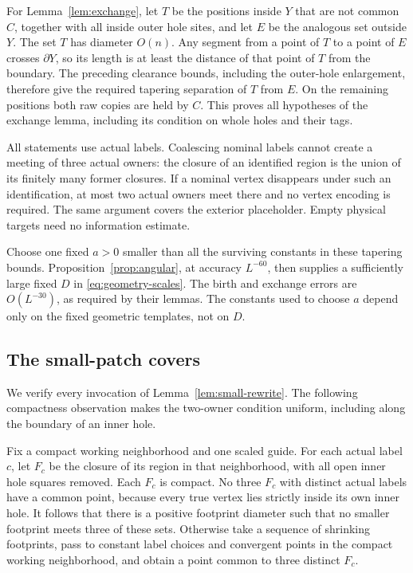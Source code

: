For Lemma~\ref{lem:exchange}, let $T$ be the positions inside $Y$
that are not common $C$, together with all inside outer hole sites,
and let $E$ be the analogous set outside $Y$.  The set $T$ has
diameter $O(n)$.  Any segment from a point of $T$ to a point of $E$
crosses $\partial Y$, so its length is at least the distance of that
point of $T$ from the boundary.  The preceding clearance bounds,
including the outer-hole enlargement, therefore give the required
tapering separation of $T$ from $E$.  On the remaining positions both
raw copies are held by $C$.  This proves all hypotheses of the exchange
lemma, including its condition on whole holes and their tags.

All statements use actual labels.  Coalescing nominal labels cannot
create a meeting of three actual owners: the closure of an identified
region is the union of its finitely many former closures.  If a nominal
vertex disappears under such an identification, at most two actual
owners meet there and no vertex encoding is required.  The same
argument covers the exterior placeholder.  Empty physical targets
need no information estimate.

Choose one fixed $a>0$ smaller than all the surviving constants in
these tapering bounds.  Proposition~\ref{prop:angular}, at accuracy
$L^{-60}$, then supplies a sufficiently large fixed $D$ in
\eqref{eq:geometry-scales}.  The birth and exchange errors are
$O(L^{-30})$, as required by their lemmas.  The constants used to
choose $a$ depend only on the fixed geometric templates, not on $D$.

\subsection{The small-patch covers}

We verify every invocation of Lemma~\ref{lem:small-rewrite}.  The
following compactness observation makes the two-owner condition
uniform, including along the boundary of an inner hole.

Fix a compact working neighborhood and one scaled guide.  For each
actual label $c$, let $F_c$ be the closure of its region in that
neighborhood, with all open inner hole squares removed.  Each $F_c$
is compact.  No three $F_c$ with distinct actual labels have a common
point, because every true vertex lies strictly inside its own inner
hole.  It follows that there is a positive footprint diameter such
that no smaller footprint meets three of these sets.  Otherwise take
a sequence of shrinking footprints, pass to constant label choices
and convergent points in the compact working neighborhood, and obtain
a point common to three distinct $F_c$.

